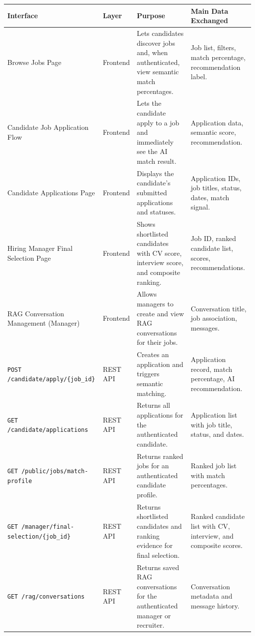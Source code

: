 \begin{center}
\label{tab:sprint3_interfaces}
\begin{tabularx}{\textwidth}{|p{4cm}|p{2.3cm}|X|p{3.9cm}|}
\hline
\rowcolor{gray!20}
\textbf{Interface} & \textbf{Layer} & \textbf{Purpose} & \textbf{Main Data Exchanged} \\
\hline
Browse Jobs Page & Frontend & Lets candidates discover jobs and, when authenticated, view semantic match percentages. & Job list, filters, match percentage, recommendation label. \\
\hline
Candidate Job Application Flow & Frontend & Lets the candidate apply to a job and immediately see the AI match result. & Application data, semantic score, recommendation. \\
\hline
Candidate Applications Page & Frontend & Displays the candidate's submitted applications and statuses. & Application IDs, job titles, status, dates, match signal. \\
\hline
Hiring Manager Final Selection Page & Frontend & Shows shortlisted candidates with CV score, interview score, and composite ranking. & Job ID, ranked candidate list, scores, recommendations. \\
\hline
RAG Conversation Management (Manager) & Frontend & Allows managers to create and view RAG conversations for their jobs. & Conversation title, job association, messages. \\
\hline
\texttt{POST /candidate/apply/\{job\_id\}} & REST API & Creates an application and triggers semantic matching. & Application record, match percentage, AI recommendation. \\
\hline
\texttt{GET /candidate/applications} & REST API & Returns all applications for the authenticated candidate. & Application list with job title, status, and dates. \\
\hline
\texttt{GET /public/jobs/match-profile} & REST API & Returns ranked jobs for an authenticated candidate profile. & Ranked job list with match percentages. \\
\hline
\texttt{GET /manager/final-selection/\{job\_id\}} & REST API & Returns shortlisted candidates and ranking evidence for final selection. & Ranked candidate list with CV, interview, and composite scores. \\
\hline
\texttt{GET /rag/conversations} & REST API & Returns saved RAG conversations for the authenticated manager or recruiter. & Conversation metadata and message history. \\
\hline
\end{tabularx}
\end{center}


